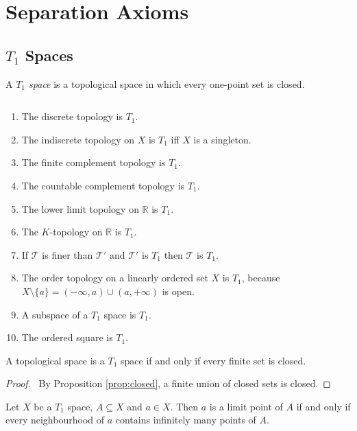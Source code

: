 \chapter{Separation Axioms}

\section{$T_1$ Spaces}

\begin{df}[$T_1$ Space]
  A \emph{$T_1$ space} is a topological space in which every one-point set is closed.
\end{df}

\begin{ex}$ $
  \begin{enumerate}
    \item
    The discrete topology is $T_1$.
    \item
    The indiscrete topology on $X$ is $T_1$ iff $X$ is a singleton.
    \item
    The finite complement topology is $T_1$.
    \item
    The countable complement topology is $T_1$.
    \item
    The lower limit topology on $\mathbb{R}$ is $T_1$.
    \item
    The $K$-topology on $\mathbb{R}$ is $T_1$.
    \item
    If $\mathcal{T}$ is finer than $\mathcal{T}'$ and $\mathcal{T}'$ is $T_1$ then $\mathcal{T}$ is $T_1$.
    \item
    The order topology on a linearly ordered set $X$ is $T_1$, because $X \setminus \{a\} = (-\infty, a) \cup (a, +\infty)$ is open.
    \item
    A subspace of a $T_1$ space is $T_1$.
    \item
    The ordered square is $T_1$.
  \end{enumerate}
\end{ex}

\begin{prop}
  A topological space is a $T_1$ space if and only if every finite set is closed.
\end{prop}

\begin{proof}
  \pf\ By Proposition \ref{prop:closed}, a finite union of closed sets is closed.
\end{proof}

\begin{prop}
  Let $X$ be a $T_1$ space, $A \subseteq X$ and $a \in X$. Then $a$ is a limit point of $A$ if and only if every neighbourhood of $a$ contains infinitely many points of $A$.
\end{prop}

